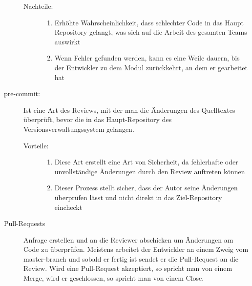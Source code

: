 \begin{description}
\begin{description}
			\item[Nachteile:] \hfill
			\begin{enumerate}
				\item Erhöhte Wahrscheinlichkeit, dass schlechter Code in das Haupt Repository gelangt, was sich auf die Arbeit des gesamten Teams auswirkt
				\item Wenn Fehler gefunden werden, kann es eine Weile dauern, bis der Entwickler zu dem Modul zurückkehrt, an dem er gearbeitet hat
			\end{enumerate}
		\end{description}
		
		
	\item [pre-commit:]
		Ist eine Art des Reviews, mit der man die Änderungen des Quelltextes überprüft, bevor die in das Haupt-Repository des Versionsverwaltungssystem gelangen.
		\begin{description}
			\item [Vorteile:] \hfill
			\begin{enumerate}
				\item Diese Art erstellt eine Art von Sicherheit, da fehlerhafte oder unvollständige Änderungen durch den Review auftreten können
				\item Dieser Prozess stellt sicher, dass der Autor seine Änderungen überprüfen lässt und nicht direkt in das Ziel-Repository eincheckt
			\end{enumerate}
		\end{description}
		
	\item [Pull-Requests]
		Anfrage erstellen und an die Reviewer abschicken um Änderungen am Code zu überprüfen. Meistens arbeitet der Entwickler an einem Zweig vom master-branch und sobald er fertig ist 			sendet er die Pull-Request an die Review. Wird eine Pull-Request akzeptiert, so spricht man von einem Merge, wird er geschlossen, so spricht man von einem Close.
	

\end{description}
